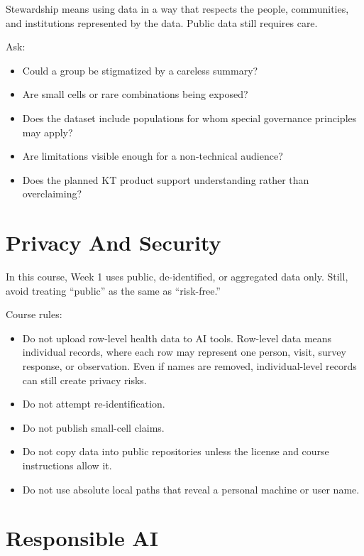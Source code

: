 \documentclass[
  letterpaper,
  DIV=11,
  numbers=noendperiod,
  oneside]{scrreprt}
\providecommand{\tightlist}{%
  \setlength{\itemsep}{0pt}\setlength{\parskip}{0pt}}
\begin{document}

Stewardship means using data in a way that respects the people,
communities, and institutions represented by the data. Public data still
requires care.

Ask:

\begin{itemize}
\tightlist
\item
  Could a group be stigmatized by a careless summary?
\item
  Are small cells or rare combinations being exposed?
\item
  Does the dataset include populations for whom special governance
  principles may apply?
\item
  Are limitations visible enough for a non-technical audience?
\item
  Does the planned KT product support understanding rather than
  overclaiming?
\end{itemize}

\section*{Privacy And Security}\label{privacy-and-security}


In this course, Week 1 uses public, de-identified, or aggregated data
only. Still, avoid treating ``public'' as the same as ``risk-free.''

Course rules:

\begin{itemize}
\tightlist
\item
  Do not upload row-level health data to AI tools. Row-level data means
  individual records, where each row may represent one person, visit,
  survey response, or observation. Even if names are removed,
  individual-level records can still create privacy risks.
\item
  Do not attempt re-identification.
\item
  Do not publish small-cell claims.
\item
  Do not copy data into public repositories unless the license and
  course instructions allow it.
\item
  Do not use absolute local paths that reveal a personal machine or user
  name.
\end{itemize}

\section*{Responsible AI}\label{responsible-ai}
\end{document}
